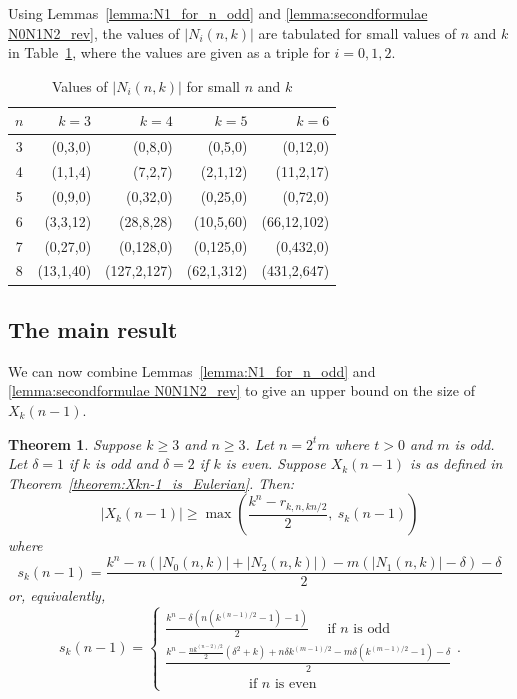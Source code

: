 \documentclass[a4paper,11pt]{article}
\theoremstyle{plain}
\newtheorem{theorem}[lemma]{Theorem}
\theoremstyle{definition}
\theoremstyle{remark}
\begin{document}
Using Lemmas~\ref{lemma:N1_for_n_odd} and \ref{lemma:secondformulae N0N1N2_rev},
the values of $|N_i(n,k)|$ are tabulated for small values of $n$ and
$k$ in Table~\ref{table:N_i(n,k)}, where the values are given as a triple for $i=0,1,2$.

\begin{table}[htb]
\centering \caption{Values of $|N_i(n,k)|$ for small $n$ and $k$} \label{table:N_i(n,k)}
\begin{tabular}{crrrr} \hline
$n$& $k=3$  & $k=4$    & $k=5$    & $k=6$     \\ \hline
3  & (0,3,0)   & (0,8,0)     & (0,5,0)     & (0,12,0)      \\ \hline
4  & (1,1,4)   & (7,2,7)     & (2,1,12)     & (11,2,17)      \\ \hline
5  & (0,9,0)   & (0,32,0)     & (0,25,0)     & (0,72,0)      \\ \hline
6  & (3,3,12)   & (28,8,28)     & (10,5,60)     & (66,12,102)      \\ \hline
7  & (0,27,0)   & (0,128,0)     & (0,125,0)     & (0,432,0)      \\ \hline
8  & (13,1,40)   & (127,2,127)     & (62,1,312)     & (431,2,647)      \\ \hline
\end{tabular}
\end{table}


\subsection{The main result}

We can now combine Lemmas~\ref{lemma:N1_for_n_odd} and \ref{lemma:secondformulae N0N1N2_rev} to
give an upper bound on the size of $X_k(n-1)$.

\begin{theorem}  \label{theorem:X_bound}
Suppose $k\geq3$ and $n\geq 3$. Let $n=2^tm$ where $t>0$ and $m$ is odd. Let $\delta=1$ if $k$ is
odd and $\delta=2$ if $k$ is even. Suppose $X_k(n-1)$ is as defined in
Theorem~\ref{theorem:Xkn-1_is_Eulerian}. Then:
\[ |X_k(n-1)|\geq \max\left(\frac{k^n-r_{k,n,kn/2}}{2},~s_k(n-1)\right) \]
where
 \[ s_k(n-1) = \frac{k^n - n(|N_0(n,k)|+|N_2(n,k)|)-m(|N_1(n,k)|-\delta)-\delta}{2}
 \]
or, equivalently,
\[ s_k(n-1) = \left\{
\begin{aligned}
\frac{k^n-\delta(n(k^{(n-1)/2}-1)-1)}{2} \text{~~~~if $n$ is odd~} \\
\frac{k^n - \frac{nk^{(n-2)/2}}{2}(\delta^2+k) +n\delta k^{(m-1)/2} - m\delta(k^{(m-1)/2}-1)
-\delta}{2} \\ \text{~~~~~~~~~~~~~~~~~~if $n$ is even~}
\end{aligned} \right..  \]
\end{theorem}
\end{document}
